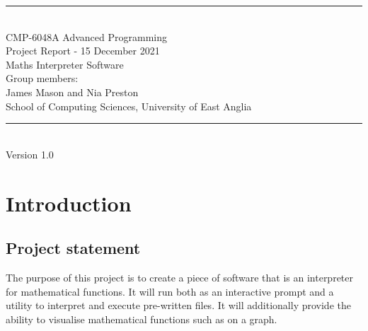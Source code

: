 \documentclass[a4paper, oneside, 11pt]{report}
\begin{document}
\begin{titlepage}
\begin{center}
\rule{12cm}{1mm} \\
\vspace{1cm}
{\large  CMP-6048A Advanced Programming}
\vspace{7.5cm}
\\{\Large Project Report - 15 December 2021}
\vspace{1.5cm}
\\{\LARGE Maths Interpreter Software}
\vspace{1.0cm}
\\{\Large Group members: \\ James Mason and Nia Preston}
\vspace{10.0cm}
\\{\large School of Computing Sciences, University of East Anglia}
\\ \rule{12cm}{0.5mm}
\\ \hspace{8.5cm} {\large Version 1.0}
\end{center}
\end{titlepage}


\setcounter{page}{1}


\begin{abstract}
In this project, our aim was to create a maths-based interpreter, capable of a range of useful mathematical operations outlined by the project brief.
This includes expression evaluation and function graphing via abstract syntax tree based interpretation. The abstract syntax tree allows the correct precedence when interpreting based on the depth of the node in the tree. Each node within the tree, implements a visitor pattern allowing further abstraction and generalisation within the interpreter. We used a scrum based development methodology to develop our language in sprints, allowing us to evolve our program over time with frequent re-adjustment of requirements and functionality.


and what your final results are, your final outcome or deliverable and conclusion.
\end{abstract}

\chapter{Introduction}
\label{chap:intro}


\section{Project statement}
The purpose of this project is to create a piece of software that is an interpreter for mathematical functions. It will run both as an interactive prompt and a utility to interpret and execute pre-written files.
It will additionally provide the ability to visualise mathematical functions such as on a graph.
\end{document}
